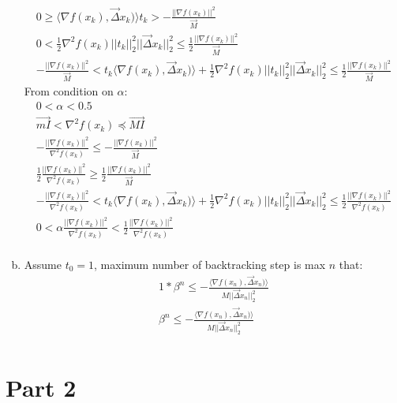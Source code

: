 \documentclass[12pt,twoside]{article}
\begin{document}
\begin{enumerate}[a)]
\begin{align}
0 \geq {\langle\nabla f(x_k), \vec{\Delta}x_k)\rangle}t_k > -\frac{||\nabla f(x_k)||^2}{\vec{M}}\\
0 < \frac{1}{2}\nabla^2 f(x_k)||t_k||_2^2||\vec{\Delta}x_k||_2^2 \leq \frac{1}{2} \frac{||\nabla f(x_k)||^2}{\vec{M}}\\
-\frac{||\nabla f(x_k)||^2}{\vec{M}} < t_k\langle\nabla f(x_k), \vec{\Delta}x_k)\rangle + \frac{1}{2}\nabla^2 f(x_k)||t_k||_2^2||\vec{\Delta}x_k||_2^2 \leq \frac{1}{2} \frac{||\nabla f(x_k)||^2}{\vec{M}}
\end{align}
From condition on $\alpha$:
\begin{align}
0 < \alpha < 0.5\\
\vec{mI} <  \nabla^2 f(x_k) \preceq \vec{MI}\\
- \frac{||\nabla f(x_k)||^2}{\nabla^2 f(x_k)} \leq - \frac{||\nabla f(x_k)||^2}{\vec{M}}\\
\frac{1}{2} \frac{||\nabla f(x_k)||^2}{\nabla^2 f(x_k)} \geq \frac{1}{2} \frac{||\nabla f(x_k)||^2}{\vec{M}}\\
- \frac{||\nabla f(x_k)||^2}{\nabla^2 f(x_k)} < t_k\langle\nabla f(x_k), \vec{\Delta}x_k)\rangle + \frac{1}{2}\nabla^2 f(x_k)||t_k||_2^2||\vec{\Delta}x_k||_2^2 \leq \frac{1}{2} \frac{||\nabla f(x_k)||^2}{\nabla^2 f(x_k)}\\
0 < \alpha \frac{||\nabla f(x_k)||^2}{\nabla^2 f(x_k)} < \frac{1}{2} \frac{||\nabla f(x_k)||^2}{\nabla^2 f(x_k)}\\
\end{align}



\item
Assume $t_0 = 1$, maximum number of backtracking step is max $n$ that:
\begin{align}
1 * \beta^n \leq - \frac{\langle\nabla f(x_n), \vec{\Delta}x_n)\rangle}{M||\vec{\Delta}x_n||_2^2}\\
\beta^n \leq - \frac{\langle\nabla f(x_n), \vec{\Delta}x_n)\rangle}{M||\vec{\Delta}x_n||_2^2}\\
\end{align}





\end{enumerate}

\section{Part 2}
\end{document}
